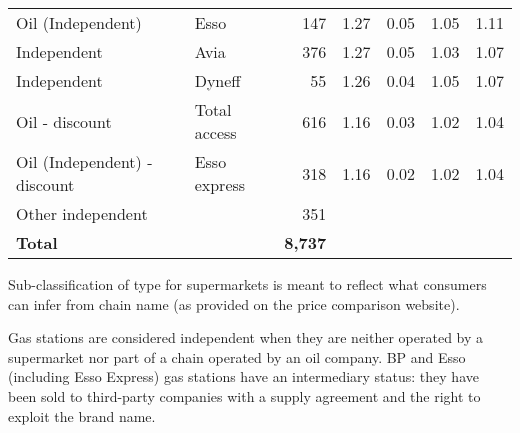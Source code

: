 \documentclass[english]{article}
\begin{document}
\begin{table}[H]
\begin{threeparttable}
\begin{tabular}{llrrrrr}
    Oil (Independent) & Esso  & 147   & 1.27  & 0.05  & 1.05  & 1.11 \\
    Independent & Avia  & 376   & 1.27  & 0.05  & 1.03  & 1.07 \\
    Independent & Dyneff & 55    & 1.26  & 0.04  & 1.05  & 1.07 \\
    Oil - discount & Total access & 616   & 1.16  & 0.03  & 1.02  & 1.04 \\
    Oil (Independent) - discount & Esso express & 318   & 1.16  & 0.02  & 1.02  & 1.04 \\
    Other independent &       & 351   &       &       &       &  \\
		\hline
    \textbf{Total} &       & \textbf{8,737} &       &       &       &  \\
    \hline
		\hline
\end{tabular}
\begin{tablenotes}
			\small
			\item Sub-classification of type for supermarkets is meant to reflect what consumers can infer from chain name (as provided on the price comparison website).
      \item Gas stations are considered independent when they are neither operated by a supermarket nor part of a chain operated by an oil company. BP and Esso (including Esso Express) gas stations  have an intermediary status: they have been sold to third-party companies with a supply agreement and the right to exploit the brand name.
\end{tablenotes}
\end{threeparttable}
\end{table}

\newpage
\end{document}
